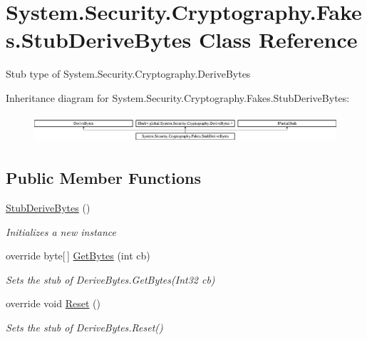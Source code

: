 \hypertarget{class_system_1_1_security_1_1_cryptography_1_1_fakes_1_1_stub_derive_bytes}{\section{System.\-Security.\-Cryptography.\-Fakes.\-Stub\-Derive\-Bytes Class Reference}
\label{class_system_1_1_security_1_1_cryptography_1_1_fakes_1_1_stub_derive_bytes}
}


Stub type of System.\-Security.\-Cryptography.\-Derive\-Bytes 


Inheritance diagram for System.\-Security.\-Cryptography.\-Fakes.\-Stub\-Derive\-Bytes\-:\begin{figure}[H]
\begin{center}
\leavevmode
\includegraphics[height=1.048689cm]{class_system_1_1_security_1_1_cryptography_1_1_fakes_1_1_stub_derive_bytes}
\end{center}
\end{figure}
\subsection*{Public Member Functions}
\begin{DoxyCompactItemize}
\item 
\hyperlink{class_system_1_1_security_1_1_cryptography_1_1_fakes_1_1_stub_derive_bytes_a85e2c129576eb1cf184d511f240a580b}{Stub\-Derive\-Bytes} ()
\begin{DoxyCompactList}\small\item\em Initializes a new instance\end{DoxyCompactList}\item 
override byte\mbox{[}$\,$\mbox{]} \hyperlink{class_system_1_1_security_1_1_cryptography_1_1_fakes_1_1_stub_derive_bytes_afbf15d1bbcbf5dda740a1f23d0874c14}{Get\-Bytes} (int cb)
\begin{DoxyCompactList}\small\item\em Sets the stub of Derive\-Bytes.\-Get\-Bytes(\-Int32 cb)\end{DoxyCompactList}\item 
override void \hyperlink{class_system_1_1_security_1_1_cryptography_1_1_fakes_1_1_stub_derive_bytes_a15c114e8c39e4c065013f9bd729493d6}{Reset} ()
\begin{DoxyCompactList}\small\item\em Sets the stub of Derive\-Bytes.\-Reset()\end{DoxyCompactList}\end{DoxyCompactItemize}
